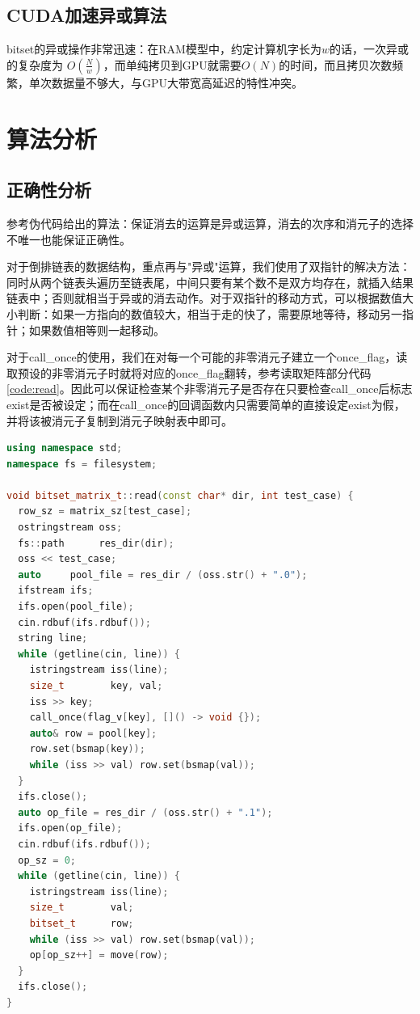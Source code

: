 \documentclass[a4paper]{article}
\begin{document}
\subsection{CUDA加速异或算法}
bitset的异或操作非常迅速：在RAM模型中，约定计算机字长为$w$的话，一次异或的复杂度为 $O(\frac{N}{w})$，而单纯拷贝到GPU就需要$O(N)$的时间，而且拷贝次数频繁，单次数据量不够大，与GPU大带宽高延迟的特性冲突。

\section{算法分析}
\subsection{正确性分析}
参考伪代码给出的算法：保证消去的运算是异或运算，消去的次序和消元子的选择不唯一也能保证正确性。

对于倒排链表的数据结构，重点再与"异或"运算，我们使用了双指针的解决方法：同时从两个链表头遍历至链表尾，中间只要有某个数不是双方均存在，就插入结果链表中；否则就相当于异或的消去动作。对于双指针的移动方式，可以根据数值大小判断：如果一方指向的数值较大，相当于走的快了，需要原地等待，移动另一指针；如果数值相等则一起移动。

对于call\_once的使用，我们在对每一个可能的非零消元子建立一个once\_flag，读取预设的非零消元子时就将对应的once\_flag翻转，参考读取矩阵部分代码 \ref{code:read}。因此可以保证检查某个非零消元子是否存在只要检查call\_once后标志exist是否被设定；而在call\_once的回调函数内只需要简单的直接设定exist为假，并将该被消元子复制到消元子映射表中即可。

\begin{lstlisting}[frame=trbl, language={C++}, caption={读取矩阵部分}, label={code:read}]
using namespace std;
namespace fs = filesystem;

void bitset_matrix_t::read(const char* dir, int test_case) {
  row_sz = matrix_sz[test_case];
  ostringstream oss;
  fs::path      res_dir(dir);
  oss << test_case;
  auto     pool_file = res_dir / (oss.str() + ".0");
  ifstream ifs;
  ifs.open(pool_file);
  cin.rdbuf(ifs.rdbuf());
  string line;
  while (getline(cin, line)) {
    istringstream iss(line);
    size_t        key, val;
    iss >> key;
    call_once(flag_v[key], []() -> void {});
    auto& row = pool[key];
    row.set(bsmap(key));
    while (iss >> val) row.set(bsmap(val));
  }
  ifs.close();
  auto op_file = res_dir / (oss.str() + ".1");
  ifs.open(op_file);
  cin.rdbuf(ifs.rdbuf());
  op_sz = 0;
  while (getline(cin, line)) {
    istringstream iss(line);
    size_t        val;
    bitset_t      row;
    while (iss >> val) row.set(bsmap(val));
    op[op_sz++] = move(row);
  }
  ifs.close();
}  
\end{lstlisting}
\end{document}
